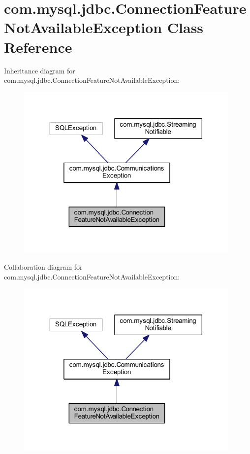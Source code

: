 \hypertarget{classcom_1_1mysql_1_1jdbc_1_1_connection_feature_not_available_exception}{}\section{com.\+mysql.\+jdbc.\+Connection\+Feature\+Not\+Available\+Exception Class Reference}
\label{classcom_1_1mysql_1_1jdbc_1_1_connection_feature_not_available_exception}


Inheritance diagram for com.\+mysql.\+jdbc.\+Connection\+Feature\+Not\+Available\+Exception\+:\nopagebreak
\begin{figure}[H]
\begin{center}
\leavevmode
\includegraphics[width=312pt]{classcom_1_1mysql_1_1jdbc_1_1_connection_feature_not_available_exception__inherit__graph}
\end{center}
\end{figure}


Collaboration diagram for com.\+mysql.\+jdbc.\+Connection\+Feature\+Not\+Available\+Exception\+:\nopagebreak
\begin{figure}[H]
\begin{center}
\leavevmode
\includegraphics[width=312pt]{classcom_1_1mysql_1_1jdbc_1_1_connection_feature_not_available_exception__coll__graph}
\end{center}
\end{figure}
